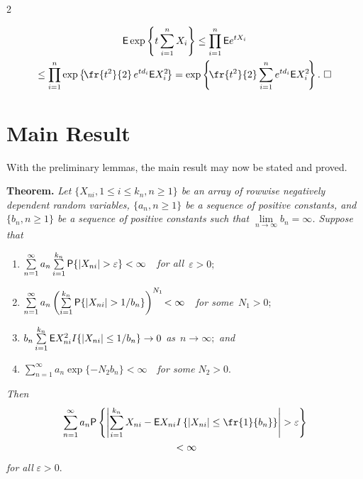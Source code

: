 \begin{multicols}{2}
\columnbreak

\noindent
\begin{multline*}
{\sf E} \exp\left\{t\sum\limits_{i=1}^n X_i\right\} \le \prod\limits_{i=1}^n {\sf E} e^{tX_i} \\
\hspace*{-3pt}{}\le \prod\limits_{i=1}^n \exp\left\{\!\fr{t^2}{2}
\,e^{td_i} {\sf E}X_i^2 \!\right\}
=\exp\left\{\!\fr{t^2}{2} \sum\limits_{i=1}^n e^{td_i} {\sf E}X_i^2\!\right\}.~\Box
\end{multline*}

\section{Main Result}

\noindent
With the preliminary lemmas, the  main result may now be stated and proved.

\medskip

\noindent 
\textbf{Theorem.} \textit{Let $\{X_{ni}, 1\le i \le k_n, n\ge 1\}$ be an array of rowwise negatively
dependent random variables, $\{a_n, n\ge 1\}$ be a sequence of positive constants, and $\{b_n, n\ge 1\}$ be a
sequence of positive constants such that $\lim\limits_{n\to\infty} b_n =\infty$. Suppose that}
\begin{enumerate}[($i$)]
\item $ \sum\limits_{n=1}^\infty a_n \sum\limits_{i=1}^{k_n} 
{\sf P}\{|X_{ni}|>\varepsilon\}<\infty$\ \textit{\ for all}\
$\varepsilon>0;$
\item $\sum\limits_{n=1}^\infty a_n \left(\sum\limits_{i=1}^{k_n}{\sf P}
\{ |X_{ni}|>1/b_n\} \right)^{N_1}\!<\infty$\
\textit{\ for some}\ $N_1>0;$
\item $b_n \sum\limits_{i=1}^{k_n} {\sf E} X_{ni}^2 I\{|X_{ni}|\le 1/b_n\} \to 0$ 
\textit{as}\ $n\to \infty;$ \textit{and}\
\item $\sum\limits_{n=1}^\infty a_n \exp\{-N_2 b_n\}<\infty$\ \textit{\ for some} $N_2>0.$
\end{enumerate}


\noindent
\textit{Then} 
\begin{multline*}
\sum\limits_{n=1}^\infty a_n {\sf P}\left\{\left| 
\sum\limits_{i=1}^{k_n} X_{ni}- {\sf E}X_{ni}I\left\{|X_{ni}|\le \fr{1}{b_n}
\right\}\right|> \varepsilon\right\}\\
{} <\infty
\end{multline*}
\textit{for all} $\varepsilon>0.$

\medskip 


\end{multicols}
